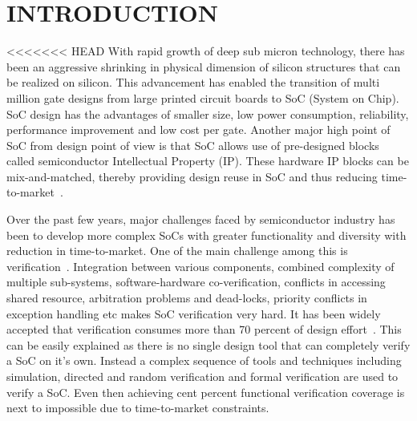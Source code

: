 \chapter{INTRODUCTION}

<<<<<<< HEAD
With rapid growth of deep sub micron technology, there has been an aggressive shrinking in physical dimension of silicon structures that can be realized on silicon. This advancement has enabled the transition of multi million gate designs from large printed circuit boards to SoC (System on Chip). SoC design has the advantages of smaller size, low power consumption, reliability, performance improvement and low cost per gate. Another major high point of SoC from design point of view is that SoC allows use of pre-designed blocks called semiconductor Intellectual Property (IP). These hardware IP blocks can be mix-and-matched, thereby providing design reuse in SoC and thus reducing time-to-market~\citep*{ieee:SOC:2010}. 


 Over the past few years, major challenges faced by semiconductor industry has been to develop more complex SoCs with greater functionality and diversity with reduction in time-to-market. One of the main challenge among this is verification~\citep*{soc}. Integration between various components, combined complexity of multiple sub-systems, software-hardware co-verification, conflicts in accessing shared resource, arbitration problems and dead-locks, priority conflicts in exception handling etc makes SoC verification very hard. It has been widely accepted that verification consumes more than 70 percent of design effort~\citep*{phd:zhang}. This can be easily explained as there is no single design tool that can completely verify a SoC on it's own. Instead a complex sequence of tools and techniques including simulation, directed and random verification and formal verification are used to verify a SoC. Even then achieving cent percent functional verification coverage is next to impossible due to time-to-market constraints.


